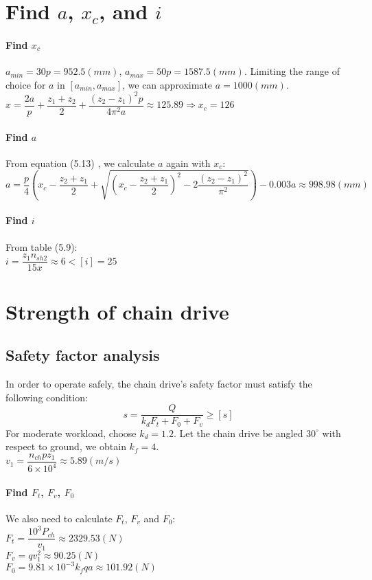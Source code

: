 \section{Find $ a $, $ x_c $, and $ i $}

\paragraph{Find $ x_c $}
$ a_{min} = 30p = 952.5 \unit{(mm)} $, $ a_{max} = 50p = 1587.5 \unit{(mm)}$. Limiting the range of choice for $ a $ in $ [a_{min},a_{max}] $, we can approximate $ a= 1000 \unit{(mm)} $.\\
$ x = \dfrac{2a}{p} + \dfrac{z_1+z_2}{2} + \dfrac{(z_2-z_1)^2p}{4\pi^2a} \approx 125.89 \Rightarrow x_c = 126 $

\paragraph{Find $ a $}
From equation (5.13) , we calculate $ a $ again with $ x_c $:\\
$ a = \dfrac{p}{4}\left(x_c-\dfrac{z_2+z_1}{2}+\sqrt{\left(x_c-\dfrac{z_2+z_1}{2}\right)^2-2\dfrac{(z_2-z_1)^2}{\pi^2}}\right) - 0.003a\approx 998.98 \unit{(mm)}$

\paragraph{Find $ i $} From table (5.9):\\ $i=\dfrac{z_1n_{sh2}}{15x}\approx6<[i]=25 $


\section{Strength of chain drive}
\subsection{Safety factor analysis}
In order to operate safely, the chain drive's safety factor must satisfy the following condition:
\[s = \dfrac{Q}{k_dF_t+F_0+F_v} \geq [s]\]
For moderate workload, choose $ k_d = 1.2 $. Let the chain drive be angled $ 30^\circ$ with respect to ground, we obtain $ k_f = 4 $.\\
$ v_1=\dfrac{n_{ch}pz_1}{6\times10^4}\approx 5.89 \unit{(m/s)}$
\paragraph{Find $ F_t $, $ F_v $, $ F_0 $}
We also need to calculate $ F_t $, $ F_v $ and $ F_0 $:\\
$ F_t = \dfrac{10^3P_{ch}}{v_1} \approx 2329.53 \unit{(N)}$\\
$ F_v=qv_1^2\approx 90.25 \unit{(N)} $\\
$ F_0=9.81\times10^{-3}k_fqa \approx101.92\unit{(N)}$
